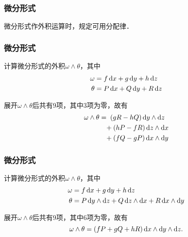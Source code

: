 \documentclass[14pt,notheorems,leqno,xcolor={rgb}]{beamer} %
\begin{document}
\begin{frame}
\frametitle{微分形式}
\vpause
\begin{remark*}
微分形式作外积运算时，规定可用分配律．
\end{remark*}
\end{frame}

\begin{frame}
\frametitle{微分形式}
\begin{example}
计算微分形式的外积$\omega\wedge\theta$，其中
\begin{align*}
  \omega &= f\mathop{}\!\mathrm{d} x + g\mathop{}\!\mathrm{d} y + h\mathop{}\!\mathrm{d} z \\
  \theta &= P\mathop{}\!\mathrm{d} x + Q\mathop{}\!\mathrm{d} y + R\mathop{}\!\mathrm{d} z
\end{align*}
\end{example}
\vpause
\begin{solution}
展开$\omega\wedge\theta$后共有$9$项，其中$3$项为零，故有
\[\omega\wedge\theta = \!\!\!\!\begin{aligned}[t]
   &\phantom{+{}}(gR-hQ)\dy\wedge\dz \\ &+ (hP-fR)\dz\wedge\dx  \\ &+ (fQ-gP)\dx\wedge\dy
\end{aligned}\]
\end{solution}
\end{frame}

\begin{frame}
\frametitle{微分形式}
\begin{example}
计算微分形式的外积$\omega\wedge\theta$，其中
\begin{align*}
  \omega &= f\dx + g\dy + h\dz \\
  \theta &= P\dy\wedge\dz + Q\dz\wedge\dx + R\dx\wedge\dy
\end{align*}
\end{example}
\vpause
\begin{solution}
展开$\omega\wedge\theta$后共有$9$项，其中$6$项为零，故有
\[ \omega\wedge\theta = (fP+gQ+hR)\mathop{}\!\mathrm{d} x\wedge\mathop{}\!\mathrm{d} y\wedge\mathop{}\!\mathrm{d} z. \]
\end{solution}
\end{frame}
\end{document}
